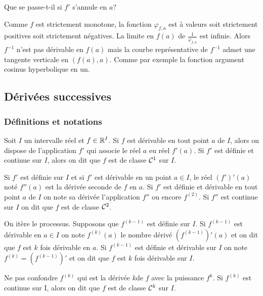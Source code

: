 Que se passe-t-il si \(f'\) s'annule en \(a\)?

Comme \(f\) est strictement monotone, la fonction \(\varphi_{f,a}\) est à
valeurs soit strictement positives soit strictement négatives. La limite en
\(f(a)\) de \(\frac{1}{\varphi_{f,a}}\) est infinie. Alors \(f^{-1}\) n'est pas
dérivable en \(f(a)\) mais la courbe représentative de \(f^{-1}\) admet une
tangente verticale en \((f(a),a)\). Comme par exemple la fonction argument
cosinus hyperbolique en un.

\subsection{Dérivées successives}

\subsubsection{Définitions et notations}

Soit \(I\) un intervalle réel et \(f \in \mathbb{R}^I\). Si \(f\) est dérivable en tout
point \(a\) de \(I\), alors on dispose de l'application \(f'\) qui associe le
réel \(a\) eu réel \(f'(a)\). Si \(f'\) est définie et continue sur \(I\), alors
on dit que \(f\) est de classe \(\mathcal{C}^{1}\) sur \(I\).

Si \(f'\) est définie sur \(I\) et si \(f'\) est dérivable en un point \(a \in
I\), le réel \((f')'(a)\) noté \(f''(a)\) est la dérivée seconde de \(f\) en
\(a\). Si \(f'\) est définie et dérivable en tout point \(a\) de \(I\) on note
sa dérivée l'application \(f''\) ou encore \(f^{(2)}\). Si \(f''\) est continue
sur \(I\) on dit que \(f\) est de classe \(\mathcal{C}^{2}\).

On itère le processus. Supposons que \(f^{(k-1)}\) est définie sur \(I\). Si
\(f^{(k-1)}\) est dérivable en \(a \in I\) on note \(f^{(k)}(a)\) le nombre
dérivé \((f^{(k-1)})'(a)\) et on dit que \(f\) est \(k\) fois dérivable en
\(a\). Si \(f^{(k-1)}\) est définie et dérivable sur \(I\) on note \(f^{(k)} =
(f^{(k-1)})'\) et on dit que \(f\) est \(k\) fois dérivable sur \(I\).

Ne pas confondre \(f^{(k)}\) qui est la dérivée \(k\)\ieme de \(f\) avec la
puissance \(f^k\). Si \(f^{(k)}\) est continue sur I, alors on dit que \(f\) est
de classe \(\mathcal{C}^{k}\) sur \(I\).

